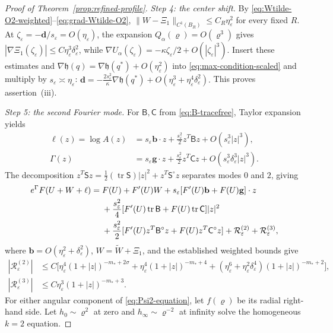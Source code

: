 \documentclass[10pt,a4paper]{amsart}
\numberwithin{equation}{section}
\theoremstyle{definition}
\theoremstyle{remark}
\newcommand{\eps}{\varepsilon}
\newcommand{\etae}{\eta_{\eps}}
\newcommand{\de}{\delta_{\eps}}
\newcommand{\tr}{\operatorname{tr}}
\begin{document}
\begin{proof}[Proof of Theorem~\ref{prop:refined-profile}]
\medskip\noindent
\emph{Step 4: the center shift.}
By \eqref{eq:Wtilde-O2-weighted}--\eqref{eq:grad-Wtilde-O2},
$\|W-\Xi_1\|_{C^1(B_R)}\le C_R\etae^2$ for every fixed $R$.
At $\zeta_\eps=-\mathbf d/s_\eps=O(\etae)$, the expansion
$Q_\alpha(\varrho)=O(\varrho^3)$ gives
$|\nabla\Xi_1(\zeta_\eps)|\le C\etae^3\de^2$, while
$\nabla U_\alpha(\zeta_\eps)=-\kappa\zeta_\eps/2+O(|\zeta_\eps|^3)$.
Insert these estimates and
$\nabla\mathfrak h(q)=\nabla\mathfrak h(q^*)+O(\etae^2)$
into \eqref{eq:max-condition-scaled} and multiply by $s_\eps\asymp\etae$:
\(
 \mathbf d=-\frac{2s_\eps^2}{\kappa}\nabla\mathfrak h(q^*)
             +O(\etae^3+\etae^4\de^2).
\)
This proves assertion~\textup{(iii)}.

\medskip
\noindent
\emph{Step 5: the second Fourier mode.}
For $\mathsf B,\mathsf C$ from \eqref{eq:B-tracefree}, Taylor expansion yields
\begin{align}
 \ell(z)=\log A(z)
 &=s_\eps \mathbf{b}\cdot z+\frac{s_\eps^2}{2}z^T\mathsf B z+O(s_\eps^3|z|^3),
 \label{eq:logA-second-correct}\\
 \Gamma(z)
 &=s_\eps \mathbf{g}\cdot z+\frac{s_\eps^2}{2}z^T\mathsf C z
   +O(s_\eps^3\de^3|z|^3).
 \label{eq:logGamma-second-correct}
\end{align}
The decomposition $z^T\mathsf S z=\tfrac12(\tr\mathsf S)|z|^2+z^T\mathsf S^\circ z$
separates modes $0$ and $2$, giving
\begin{align}
 e^\Gamma F(U+W+\ell)
 ={}&F(U)+F'(U)W+s_\eps[F'(U)\mathbf{b}+F(U)\mathbf{g}]\cdot z
 \notag\\
 &+\frac{s_\eps^2}{4}[F'(U)\tr\mathsf B+F(U)\tr\mathsf C]|z|^2
 \notag\\
 &+\frac{s_\eps^2}{2}[F'(U)z^T\mathsf B^\circ z+F(U)z^T\mathsf C^\circ z]
   +\mathcal R_\eps^{(2)}+\mathcal R_\eps^{(3)},
 \label{eq:full-second-order-expansion}
\end{align}
where $\mathbf{b}=O(\etae^2+\de^2)$, $W=\widetilde W+\Xi_1$, and the
established weighted bounds give
\begin{align}
 |\mathcal R_\eps^{(2)}|
 &\le C\big[\etae^4(1+|z|)^{-m_*+2\sigma}
       +\etae^4(1+|z|)^{-m_*+4}
 +(\etae^6+\etae^2\de^4)(1+|z|)^{-m_*+2}\big],
 \label{R1}\\
 |\mathcal R_\eps^{(3)}|
 &\le C\etae^3(1+|z|)^{-m_*+3}.
 \label{R2}
\end{align}
For either angular component of \eqref{eq:Psi2-equation}, let $f(\varrho)$
be its radial right-hand side. Let $h_0\sim\varrho^2$ at zero and
$h_\infty\sim\varrho^{-2}$ at infinity solve the homogeneous $k=2$ equation.

\end{proof}
\end{document}
